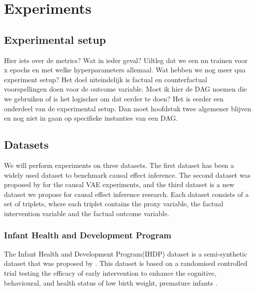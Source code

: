 \documentclass{report}
\begin{document}

\chapter{Experiments}

\section{Experimental setup}
Hier iets over de metrics?
Wat in ieder geval? Uiltleg dat we een nn trainen voor x epochs en met welke hyperparameters allemaal. Wat hebben we nog meer qua experiment setup? Het doel uiteindelijk is factual en counterfactual voorspellingen doen voor de outcome variable. Moet ik hier de DAG noemen die we gebruiken of is het logischer om dat eerder te doen? Het is eerder een onderdeel van de experimental setup. Dan moet hoofdstuk twee algemener blijven en nog niet in gaan op specifieke instanties van een DAG.



\section{Datasets}
We will perform experiments on three datasets. The first dataset has been a widely used dataset to benchmark causal effect inference. The second dataset was proposed by \cite{louizos2017causal} for the causal VAE experiments, and the third dataset is a new dataset we propose for causal effect inference research. Each dataset consists of a set of triplets, where each triplet contains the proxy variable, the factual intervention variable and the factual outcome variable.

\subsection{Infant Health and Development Program}
The Infant Health and Development Program(IHDP) dataset is a semi-synthetic dataset that was proposed by \cite{hill2011bayesian}. This dataset is based on a randomised controlled trial testing the efficacy of early intervention to enhance the cognitive, behavioural, and health status of low birth weight, premature infants \cite{ramey1992infant}. 
\end{document}

